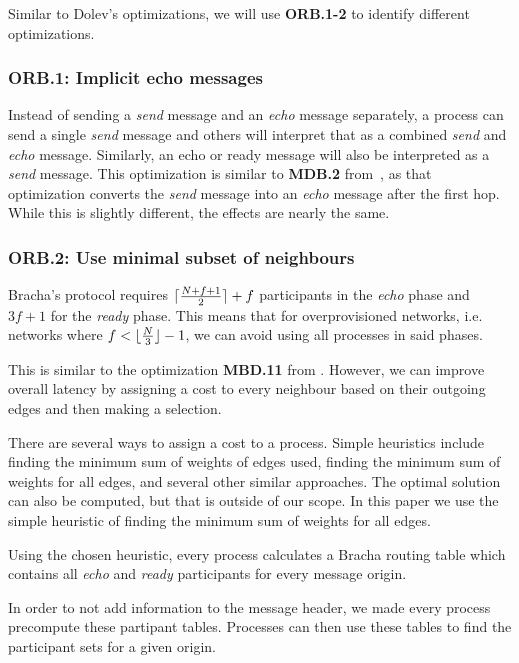 Similar to Dolev's optimizations, we will use \textbf{ORB.1-2} to identify different optimizations.

\subsubsection{ORB.1: Implicit echo messages}
Instead of sending a \textit{send} message and an \textit{echo} message separately, a process can send a single \textit{send} message and others will interpret that as a combined \textit{send} and \textit{echo} message. Similarly, an echo or ready message will also be interpreted as a \textit{send} message. This optimization is similar to \textbf{MDB.2} from~\cite{bonomi2021practical}, as that optimization converts the \textit{send} message into an \textit{echo} message after the first hop. While this is slightly different, the effects are nearly the same.


\subsubsection{ORB.2: Use minimal subset of neighbours}
Bracha's protocol requires $\lceil\frac{N+f+1}{2}\rceil + f$ participants in the \textit{echo} phase and $3f+1$ for the \textit{ready} phase. This means that for overprovisioned networks, i.e. networks where $f < \lfloor\frac{N}{3}\rfloor - 1$, we can avoid using all processes in said phases.

This is similar to the optimization \textbf{MBD.11} from \cite{bonomi2021practical}. However, we can improve overall latency by assigning a cost to every neighbour based on their outgoing edges and then making a selection. 

There are several ways to assign a cost to a process. Simple heuristics include finding the minimum sum of weights of edges used, finding the minimum sum of weights for all edges, and several other similar approaches. The optimal solution can also be computed, but that is outside of our scope. In this paper we use the simple heuristic of finding the minimum sum of weights for all edges.

Using the chosen heuristic, every process calculates a Bracha routing table which contains all \textit{echo} and \textit{ready} participants for every message origin.

In order to not add information to the message header, we made every process precompute these partipant tables. Processes can then use these tables to find the participant sets for a given origin.

